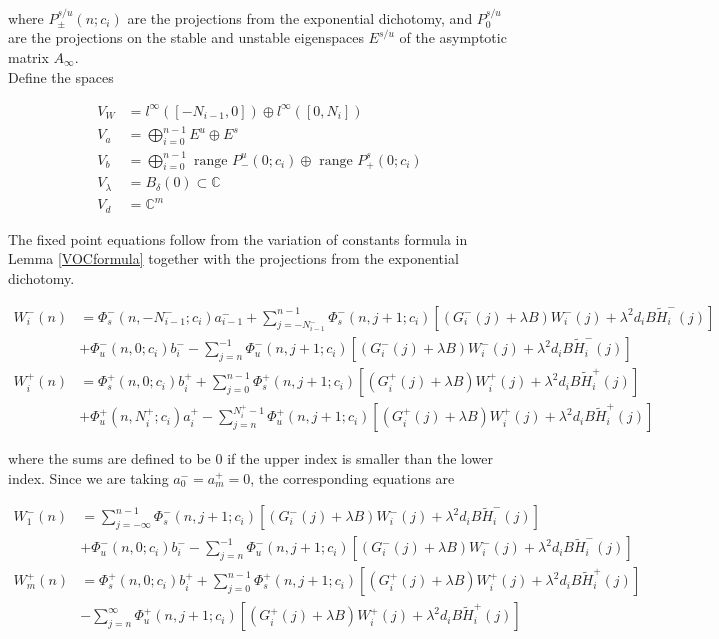 \documentclass[12pt]{article}
\def\C{{\mathbb C}}
\begin{document}
where $P_\pm^{s/u}(n; c_i)$ are the projections from the exponential dichotomy, and $P_0^{s/u}$ are the projections on the stable and unstable eigenspaces $E^{s/u}$ of the asymptotic matrix $A_\infty$.\\

Define the spaces

\begin{align*}
V_W &= l^\infty([-N_{i-1}, 0]) \oplus l^\infty([0, N_i])  \\
V_a &= \bigoplus_{i=0}^{n-1} E^u \oplus E^s \\
V_b &= \bigoplus_{i=0}^{n-1} 
\text{ range } P_-^u(0; c_i) \oplus \text{ range } P_+^s(0; c_i)\\
V_\lambda &= B_\delta(0) \subset \C \\
V_d &= \C^m
\end{align*}

The fixed point equations follow from the variation of constants formula in Lemma \ref{VOCformula} together with the projections from the exponential dichotomy.

\begin{align*}
W_i^-(n) &= 
\Phi_s^-(n, -N_{i-1}^-; c_i) a_{i-1}^- + \sum_{j = -N_{i-1}^-}^{n-1} \Phi_s^-(n, j+1; c_i)
[(G_i^-(j) + \lambda B) W_i^-(j) + \lambda^2 d_i B \tilde{H}_i^-(j)]
 \\
&+ \Phi_u^-(n, 0; c_i) b_i^- - \sum_{j = n}^{-1} \Phi_u^-(n, j+1; c_i) 
[(G_i^-(j) + \lambda B) W_i^-(j) + \lambda^2 d_i B \tilde{H}_i^-(j)] \\
W_i^+(n) &= \Phi_s^+(n, 0; c_i) b_i^+ + \sum_{j = 0}^{n-1} \Phi_s^+(n, j+1; c_i) 
[(G_i^+(j) + \lambda B) W_i^+(j) + \lambda^2 d_i B \tilde{H}_i^+(j)] \\
&+ \Phi_u^+(n, N_i^+; c_i) a_i^+ - \sum_{j = n}^{N_i^+-1} \Phi_u^+(n, j+1; c_i) 
[(G_i^+(j) + \lambda B) W_i^+(j) + \lambda^2 d_i B \tilde{H}_i^+(j)]
\end{align*}

where the sums are defined to be $0$ if the upper index is smaller than the lower index. Since we are taking $a_0^- = a_m^+ = 0$, the corresponding equations are

\begin{align*}
W_1^-(n) &= \sum_{j = -\infty}^{n-1} \Phi_s^-(n, j+1; c_i)
[(G_i^-(j) + \lambda B) W_i^-(j) + \lambda^2 d_i B \tilde{H}_i^-(j)]
 \\
&+ \Phi_u^-(n, 0; c_i) b_i^- - \sum_{j = n}^{-1} \Phi_u^-(n, j+1; c_i) 
[(G_i^-(j) + \lambda B) W_i^-(j) + \lambda^2 d_i B \tilde{H}_i^-(j)] \\
W_m^+(n) &= \Phi_s^+(n, 0; c_i) b_i^+ + \sum_{j = 0}^{n-1} \Phi_s^+(n, j+1; c_i) 
[(G_i^+(j) + \lambda B) W_i^+(j) + \lambda^2 d_i B \tilde{H}_i^+(j)] \\
&- \sum_{j = n}^{\infty} \Phi_u^+(n, j+1; c_i) 
[(G_i^+(j) + \lambda B) W_i^+(j) + \lambda^2 d_i B \tilde{H}_i^+(j)]
\end{align*}
\end{document}
